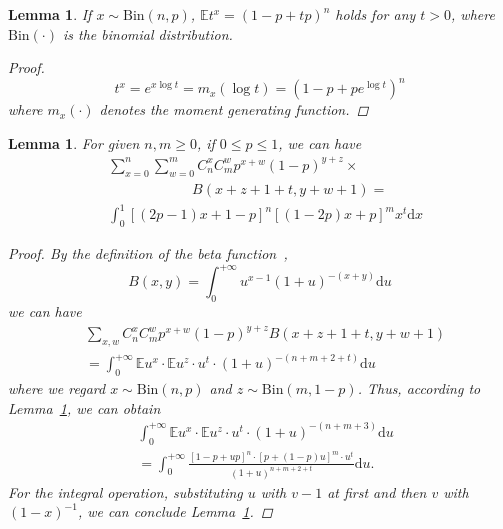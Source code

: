 \documentclass{article}
\newtheorem{lemma}[theorem]{Lemma}
\begin{document}

\begin{lemma}
\label{MoGene}
If $x\sim \mathrm{Bin}(n,p)$, $\mathbb{E}t^x= \left(1-p+tp\right)^{n}$ holds for any $t>0$, where $\mathrm{Bin}(\cdot)$ is the binomial distribution.
\begin{proof}
\begin{equation}
t^x = e^{x\log t}=m_x(\log t)= \left(1-p+pe^{\log t}\right)^{n}
\end{equation}
where $m_x(\cdot)$ denotes the moment generating function.
\end{proof}
\end{lemma}

\begin{lemma}
\label{SolveF}
For given $n,m\geq 0$, if $0\leq p\leq 1$, we can have
\begin{equation*}
\begin{split}
&{\sum}_{x=0}^{n}{\sum}_{w=0}^{m} C_{n}^{x}C_{m}^{w}p^{x+w}(1-p)^{y+z}\times\\
&\qquad\qquad\qquad B(x+z+1+t,y+w+1)=\\
&\int_{0}^{1}[(2p-1)x+1-p]^{n}[(1-2p)x+p]^{m}x^{t}\mathrm{d}x
\end{split}
\end{equation*}
\begin{proof}
By the definition of the beta function~\cite{olver2010nist},
\begin{equation}
B(x, y) = \int_{0}^{+\infty} u^{x-1}(1+u)^{-(x+y)}\mathrm{d}u
\end{equation}
we can have
\begin{align}
&\sum_{x,w} C_{n}^{x}C_{m}^{w}p^{x+w}(1-p)^{y+z}B(x+z+1+t,y+w+1)\nonumber\\
&= \int_{0}^{+\infty} \mathbb{E}u^{x}\cdot\mathbb{E}u^z \cdot u^t\cdot (1+u)^{-(n+m+2+t)}\mathrm{d}u
\end{align}
where we regard $x\sim \mathrm{Bin}(n,p)$ and $z\sim \mathrm{Bin}(m,1-p)$.
Thus, according to Lemma~\ref{MoGene}, we can obtain
\begin{equation}
\begin{split}
&\int_{0}^{+\infty} \mathbb{E}u^{x}\cdot\mathbb{E}u^z \cdot u^t\cdot (1+u)^{-(n+m+3)}\mathrm{d}u\\
&=\int_{0}^{+\infty} \frac{[1-p+up]^n\cdot [p+(1-p)u]^m\cdot u^t}{(1+u)^{n+m+2+t}}\mathrm{d}u.
\end{split}
\end{equation}
For the integral operation, substituting $u$ with $v-1$ at first and then $v$ with $(1-x)^{-1}$, we can conclude Lemma~\ref{SolveF}.
\end{proof}
\end{lemma}
\end{document}
